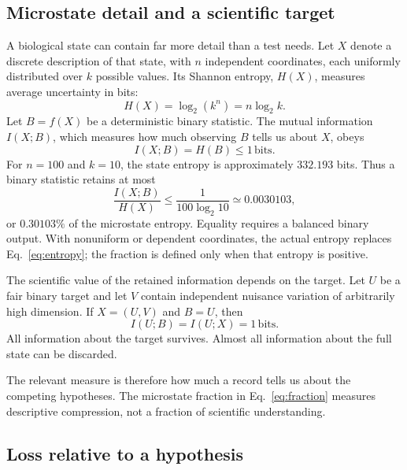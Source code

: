\documentclass[10pt,twocolumn]{article}
\newcommand{\bits}{\,\mathrm{bits}}
\begin{document}
\subsection{Microstate detail and a scientific target}

A biological state can contain far more detail than a test needs. Let \(X\) denote a discrete description of that state, with \(n\) independent coordinates, each uniformly distributed over \(k\) possible values. Its Shannon entropy, \(H(X)\), measures average uncertainty in bits:
\begin{equation}
H(X)=\log_2(k^n)=n\log_2 k.
\label{eq:entropy}
\end{equation}
Let \(B=f(X)\) be a deterministic binary statistic. The mutual information \(I(X;B)\), which measures how much observing \(B\) tells us about \(X\), obeys
\begin{equation}
I(X;B)=H(B)\leq 1\bits.
\label{eq:binary}
\end{equation}
For \(n=100\) and \(k=10\), the state entropy is approximately \(332.193\) bits. Thus a binary statistic retains at most
\begin{equation}
\frac{I(X;B)}{H(X)}
\leq \frac{1}{100\log_2 10}
\simeq 0.0030103,
\label{eq:fraction}
\end{equation}
or \(0.30103\%\) of the microstate entropy. Equality requires a balanced binary output. With nonuniform or dependent coordinates, the actual entropy replaces Eq.~\eqref{eq:entropy}; the fraction is defined only when that entropy is positive.

The scientific value of the retained information depends on the target. Let \(U\) be a fair binary target and let \(V\) contain independent nuisance variation of arbitrarily high dimension. If \(X=(U,V)\) and \(B=U\), then
\begin{equation}
I(U;B)=I(U;X)=1\bits.
\end{equation}
All information about the target survives. Almost all information about the full state can be discarded.

The relevant measure is therefore how much a record tells us about the competing hypotheses. The microstate fraction in Eq.~\eqref{eq:fraction} measures descriptive compression, not a fraction of scientific understanding.

\subsection{Loss relative to a hypothesis}
\end{document}
